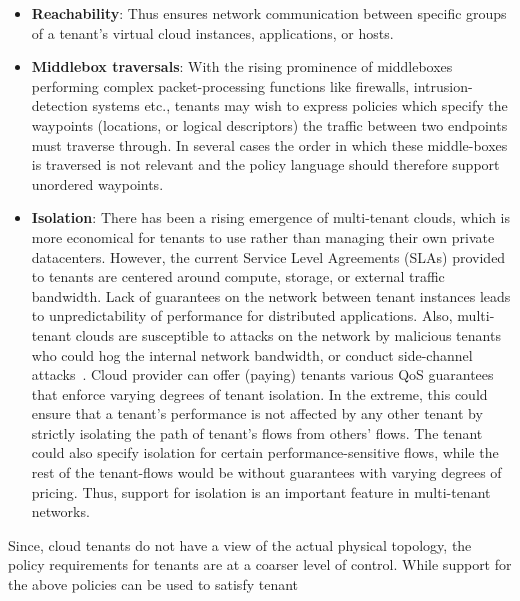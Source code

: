 \begin{itemize}
\item \textbf{Reachability}: Thus ensures network communication
  between specific groups of a tenant's virtual cloud instances,
  applications, or hosts. 
\item \textbf{Middlebox traversals}: With the rising prominence of
  middleboxes performing complex packet-processing functions like
  firewalls, intrusion-detection systems etc., tenants may wish to
  express policies which specify the waypoints (locations, or logical
  descriptors) the traffic between two
  endpoints must traverse through.	  
    In several cases  the order in which these middle-boxes is traversed
    is not relevant and the policy language should therefore support unordered waypoints.
\item \textbf{Isolation}: There has been a rising emergence of 
multi-tenant clouds, which is more economical for tenants to use
rather than managing their own private datacenters. However,
the current Service Level Agreements (SLAs)
provided to tenants are centered around compute, storage, or
external traffic bandwidth. Lack of guarantees on the network
between tenant instances leads to unpredictability of performance
for distributed applications. Also, multi-tenant clouds are
susceptible to attacks on the network by malicious tenants who could
hog the internal network bandwidth, or conduct side-channel
attacks~\cite{heyyou-ccs}. %
Cloud provider can offer (paying) tenants various QoS guarantees
that enforce varying degrees of tenant isolation. In the extreme,
this could ensure that a tenant's performance is not affected by
any other tenant by strictly isolating the path of tenant's flows
from others' flows.  The tenant could also specify isolation for certain
 performance-sensitive flows, while the rest of the tenant-flows
  would be without guarantees with varying degrees of pricing. 
  Thus, support for isolation is an important feature in multi-tenant 
  networks. 
 \end{itemize}
Since, cloud tenants do not have a view of the actual physical
topology, the policy requirements for tenants are at a coarser level
of control. While support for the above policies can be used to satisfy tenant
